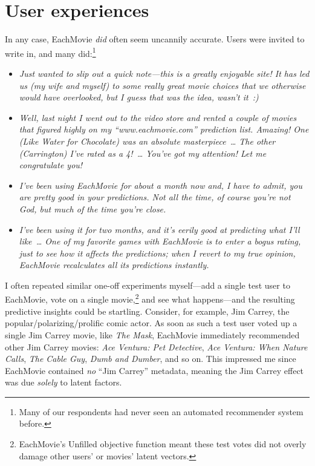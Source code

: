 \documentclass[sigconf,authorversion,screen,microtype={protrusion=true,expansion,kerning,spacing}]{acmart}
\begin{document}
\section{User experiences}

In any case, EachMovie \emph{did} often seem uncannily accurate. Users were invited to write in, and many did:\footnote{Many of our respondents had never seen an automated recommender system before.}

\begin{itemize}
    \item \emph{Just wanted to slip out a quick note---this is a greatly enjoyable site! It has led us (my wife and myself) to some really great movie choices that we otherwise would have overlooked, but I guess that was the idea, wasn't it~:)}
  
    \item \emph{Well, last night I went out to the video store and rented a couple of movies that figured highly on my ``www.eachmovie.com'' prediction list. Amazing! One (\emph{Like Water for Chocolate}) was an absolute masterpiece~\ldots{} The other (\emph{Carrington}) I've rated as a 4!\;~\ldots{} You've got my attention! Let me congratulate you!}

      \item \emph{I've been using EachMovie for about a month now and, I have to admit, you are pretty good in your predictions. Not all the time, of course you're not God, but much of the time you're close.}

    \item \emph{I've been using it for two months, and it's eerily good at predicting what I'll like~\ldots{} One of my favorite games with EachMovie is to enter a bogus rating, just to see how it affects the predictions; when I revert to my true opinion, EachMovie recalculates all its predictions instantly.}

    \end{itemize}

I often repeated similar one-off experiments myself---add a single test user to EachMovie, vote on a single movie,\footnote{EachMovie's Unfilled objective function meant these test votes did not overly damage other users' or movies' latent vectors.} and see what happens---and the resulting predictive insights could be startling. Consider, for example, Jim Carrey, the popular/\allowbreak{}polarizing/\allowbreak{}prolific comic actor. As soon as such a test user voted up a single Jim Carrey movie, like \emph{The Mask}, EachMovie immediately recommended other Jim Carrey movies: \emph{Ace Ventura: Pet Detective}, \emph{Ace Ventura: When Nature Calls}, \emph{The Cable Guy}, \emph{Dumb and Dumber}, and so on. This impressed me since EachMovie contained \emph{no} ``Jim Carrey'' metadata, meaning the Jim Carrey effect was due \emph{solely} to latent factors.
\end{document}
